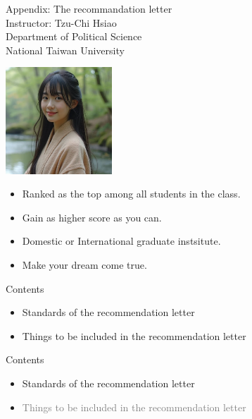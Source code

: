 \documentclass{beamer}
\title{}
\author{}
\date{}
\begin{document}
\begin{frame}
\begin{center}
\Large{Appendix: The recommandation letter} \\
\vspace{3em}
\normalsize{Instructor: Tzu-Chi Hsiao} \\
\vspace{3em}
\small{Department of Political Science} \\
\vspace{1em}
\small{National Taiwan University} \\
\end{center}
\end{frame}
\begin{frame}{}
\begin{center}
\includegraphics[width=0.3\textwidth]{letter.png} \\
\end{center}
\begin{itemize}
\item Ranked as the top among all students in the class.
\item Gain as higher score as you can.
\item Domestic or International graduate instsitute.
\item Make your dream come true.
\end{itemize}
\end{frame}
\begin{frame}{Contents}
\begin{itemize}
\item Standards of the recommendation letter
\item Things to be included in the recommendation letter
\end{itemize}
\end{frame}
\begin{frame}{Contents}
\begin{itemize}
\item Standards of the recommendation letter
\item \textcolor{gray}{Things to be included in the recommendation letter}
\end{itemize}
\end{frame}
\end{document}
